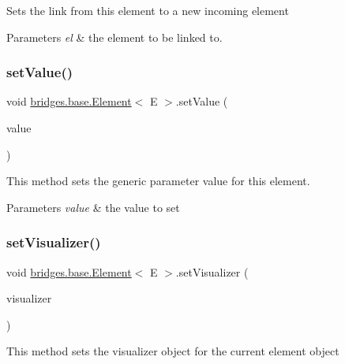 Sets the link from this element to a new incoming element


\begin{DoxyParams}{Parameters}
{\em el} & the element to be linked to. \\
\hline
\end{DoxyParams}
\mbox{\label{classbridges_1_1base_1_1_element_ab3cf1241da0bc4c59cea9d6f0fd7aaf4}} 
\subsubsection{\texorpdfstring{set\+Value()}{setValue()}}
{\footnotesize\ttfamily void \mbox{\hyperlink{classbridges_1_1base_1_1_element}{bridges.\+base.\+Element}}$<$ E $>$.set\+Value (\begin{DoxyParamCaption}\item[{E}]{value }\end{DoxyParamCaption})}

This method sets the generic parameter value for this element.


\begin{DoxyParams}{Parameters}
{\em value} & the value to set \\
\hline
\end{DoxyParams}
\mbox{\label{classbridges_1_1base_1_1_element_a5befa95788099f1bc72cdf5361c55bed}} 
\subsubsection{\texorpdfstring{set\+Visualizer()}{setVisualizer()}}
{\footnotesize\ttfamily void \mbox{\hyperlink{classbridges_1_1base_1_1_element}{bridges.\+base.\+Element}}$<$ E $>$.set\+Visualizer (\begin{DoxyParamCaption}\item[{\mbox{\hyperlink{classbridges_1_1base_1_1_element_visualizer}{Element\+Visualizer}}}]{visualizer }\end{DoxyParamCaption})}

This method sets the visualizer object for the current element object


